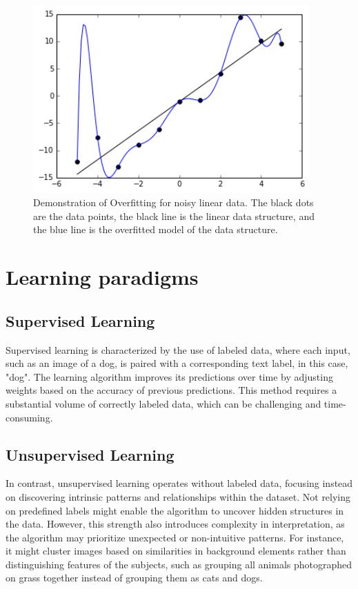 \begin{figure}
    \centering
    \includegraphics[width=400px]{Figures/Overfitted_Data.png}
    \caption{Demonstration of Overfitting for noisy linear data. The black dots are the data points, the black line is the linear data structure, and the blue line is the overfitted model of the data structure.}
    \label{fig: overfitting}
\end{figure}


\section{Learning paradigms}
\subsection{Supervised Learning}
Supervised learning is characterized by the use of labeled data, where each input, such as an image of a dog, is paired with a corresponding text label, in this case, "dog"\cite{Sarker2021}. The learning algorithm improves its predictions over time by adjusting weights based on the accuracy of previous predictions. This method requires a substantial volume of correctly labeled data, which can be challenging and time-consuming.

\subsection{Unsupervised Learning}
In contrast, unsupervised learning operates without labeled data, focusing instead on discovering intrinsic patterns and relationships within the dataset\cite{Sarker2021}. Not relying on predefined labels might enable the algorithm to uncover hidden structures in the data. However, this strength also introduces complexity in interpretation, as the algorithm may prioritize unexpected or non-intuitive patterns. For instance, it might cluster images based on similarities in background elements rather than distinguishing features of the subjects, such as grouping all animals photographed on grass together instead of grouping them as cats and dogs.

